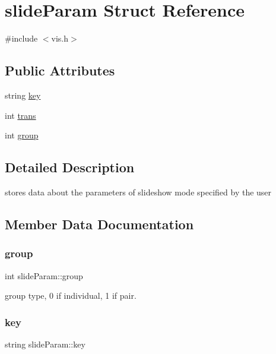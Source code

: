 \hypertarget{structslide_param}{}\section{slide\+Param Struct Reference}
\label{structslide_param}


{\ttfamily \#include $<$vis.\+h$>$}

\subsection*{Public Attributes}
\begin{DoxyCompactItemize}
\item 
string \mbox{\hyperlink{structslide_param_aff2f7e9ee5cf79eff9bb1dcb72cec41e}{key}}
\item 
int \mbox{\hyperlink{structslide_param_a573b67ecfcd670121b0fa2f7317ab2d6}{trans}}
\item 
int \mbox{\hyperlink{structslide_param_a742d4e9be7b5c16734b17a2d55b555c3}{group}}
\end{DoxyCompactItemize}


\subsection{Detailed Description}
stores data about the parameters of slideshow mode specified by the user 

\subsection{Member Data Documentation}
\mbox{\label{structslide_param_a742d4e9be7b5c16734b17a2d55b555c3}} 
\subsubsection{\texorpdfstring{group}{group}}
{\footnotesize\ttfamily int slide\+Param\+::group}

group type, 0 if individual, 1 if pair. \mbox{\label{structslide_param_aff2f7e9ee5cf79eff9bb1dcb72cec41e}} 
\subsubsection{\texorpdfstring{key}{key}}
{\footnotesize\ttfamily string slide\+Param\+::key}

